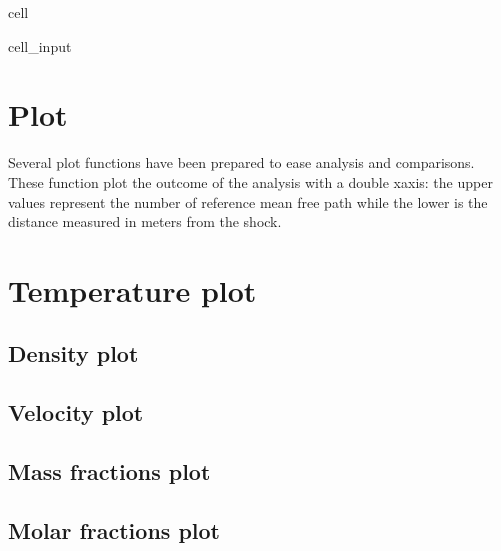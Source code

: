 \documentclass[letterpaper,10pt,english]{jupyterBook}
\begin{document}
\begin{sphinxuseclass}{cell}
\begin{sphinxVerbatimInput}
\begin{sphinxuseclass}{cell_input}
\begin{sphinxVerbatim}[commandchars=\\\{\}]
      
      
      
    
  
\end{sphinxVerbatim}

\end{sphinxuseclass}\end{sphinxVerbatimInput}

\end{sphinxuseclass}

\section{Plot}
\label{\detokenize{1_Temperature/Problem_class_definition:plot}}
\sphinxAtStartPar
Several plot functions have been prepared to ease analysis and comparisons. These function plot the outcome of the analysis with a double x\sphinxhyphen{}axis: the upper values represent the number of reference mean free path while the lower is the distance measured in meters from the shock.


\section{Temperature plot}
\label{\detokenize{1_Temperature/Problem_class_definition:temperature-plot}}

\subsection{Density plot}
\label{\detokenize{1_Temperature/Problem_class_definition:density-plot}}

\subsection{Velocity plot}
\label{\detokenize{1_Temperature/Problem_class_definition:velocity-plot}}

\subsection{Mass fractions plot}
\label{\detokenize{1_Temperature/Problem_class_definition:mass-fractions-plot}}

\subsection{Molar fractions plot}
\label{\detokenize{1_Temperature/Problem_class_definition:molar-fractions-plot}}
\end{document}
